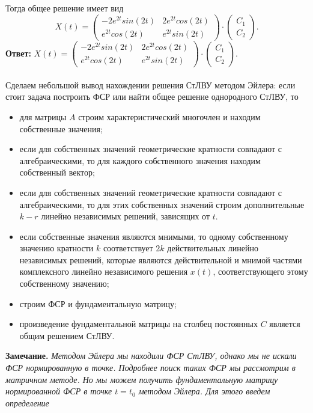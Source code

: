 \documentclass[a4paper, 12pt]{article}
\begin{document}
Тогда общее решение имеет вид $$X(t) = \begin{pmatrix}
	-2e^{2t}sin(2t) & 2e^{2t}cos(2t)\\
	e^{2t}cos(2t) & e^{2t}sin(2t)
\end{pmatrix}\cdot \begin{pmatrix}
C_1\\C_2
\end{pmatrix}.$$
\textbf{Ответ:} $X(t) = \begin{pmatrix}
	-2e^{2t}sin(2t) & 2e^{2t}cos(2t)\\
	e^{2t}cos(2t) & e^{2t}sin(2t)
\end{pmatrix}\cdot \begin{pmatrix}
	C_1\\C_2
\end{pmatrix}.$\\\\
Сделаем небольшой вывод нахождении решения СтЛВУ методом Эйлера: если стоит задача построить ФСР или найти общее решение однородного СтЛВУ, то
\begin{itemize}
	\item для матрицы $A$ строим характеристический многочлен и находим собственные значения;
	\item если для собственных значений геометрические кратности  совпадают с алгебраическими, то для каждого собственного значения находим собственный вектор;
	\item если для собственных значений геометрические кратности  совпадают с алгебраическими, то для этих собственных значений строим дополнительные $k-r$ линейно независимых решений, зависящих от $t$.
	\item если собственные значения являются мнимыми, то одному собственному значению кратности $k$ соответствует $2k$ действительных линейно независимых решений, которые являются действительной и мнимой частями комплексного линейно независимого решения $x(t)$, соответствующего этому собственному значению;
	\item строим ФСР и фундаментальную матрицу;
	\item произведение фундаментальной матрицы на столбец постоянных $C$ является общим решением СтЛВУ.
\end{itemize}
\textbf{Замечание.} \textit{Методом Эйлера мы находили ФСР СтЛВУ, однако мы не искали ФСР нормированную в точке. Подробнее поиск таких ФСР мы рассмотрим в матричном методе. Но мы можем получить фундаментальную матрицу нормированной ФСР в точке $t=t_0$ методом Эйлера. Для этого введем определение}\\\\
\end{document}
